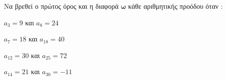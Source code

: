 Να βρεθεί ο πρώτος όρος και η διαφορά $ \mathbold\omega $ κάθε αριθμητικής προόδου όταν :
\begin{multicols}{2}
\begin{alist}
\item $ a_3=9 $ και $ a_{8}=24 $
\item $ a_7=18 $ και $ a_{18}=40 $
\item $ a_{12}=30 $ και $ a_{25}=72 $
\item $ a_{14}=21 $ και $ a_{30}=-11 $
\end{alist}
\end{multicols}

